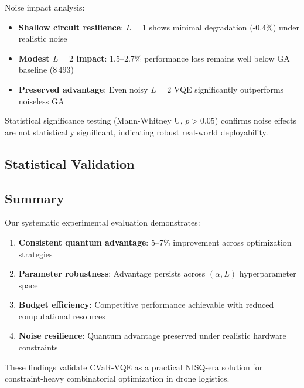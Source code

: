 Noise impact analysis:
\begin{itemize}
    \item \textbf{Shallow circuit resilience}: $L=1$ shows minimal degradation (-0.4\%) under realistic noise
    \item \textbf{Modest $L=2$ impact}: 1.5--2.7\% performance loss remains well below GA baseline ($8\,493$)
    \item \textbf{Preserved advantage}: Even noisy $L=2$ VQE significantly outperforms noiseless GA
\end{itemize}

Statistical significance testing (Mann-Whitney U, $p > 0.05$) confirms noise effects are not statistically significant, indicating robust real-world deployability.

\subsection{Statistical Validation}


\subsection{Summary}

Our systematic experimental evaluation demonstrates:
\begin{enumerate}[nosep]
    \item \textbf{Consistent quantum advantage}: 5--7\% improvement across optimization strategies
    \item \textbf{Parameter robustness}: Advantage persists across $(\alpha, L)$ hyperparameter space  
    \item \textbf{Budget efficiency}: Competitive performance achievable with reduced computational resources
    \item \textbf{Noise resilience}: Quantum advantage preserved under realistic hardware constraints
\end{enumerate}

These findings validate CVaR-VQE as a practical NISQ-era solution for constraint-heavy combinatorial optimization in drone logistics.

